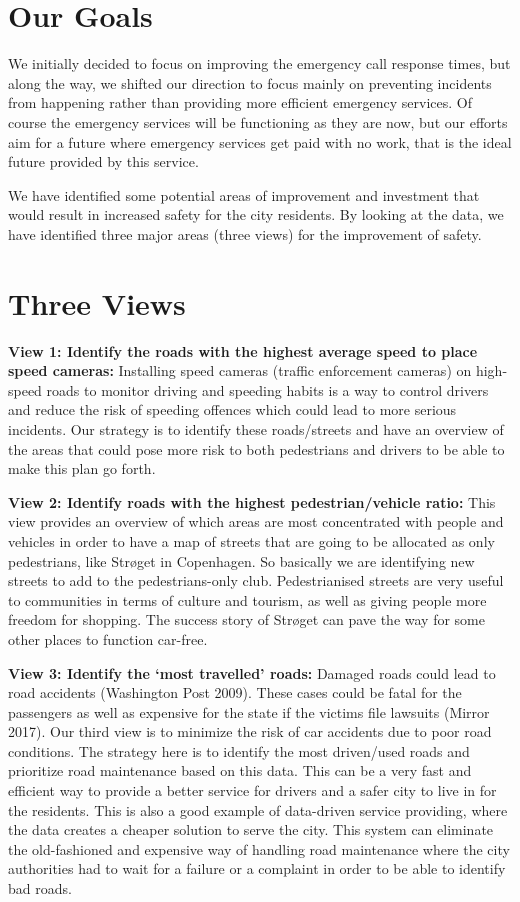 \documentclass[format=acmsmall, review=false, screen=true]{acmart}
\begin{document}
\section{Our Goals}
We initially decided to focus on improving the emergency call response times, but along the way, we shifted our direction to focus mainly on preventing incidents from happening rather than providing more efficient emergency services. Of course the emergency services will be functioning as they are now, but our efforts aim for a future where emergency services get paid with no work, that is the ideal future provided by this service.

We have identified some potential areas of improvement and investment that would result in increased safety for the city residents. By looking at the data, we have identified three major areas (three views) for the improvement of safety.

\section{Three Views}
\textbf{View 1: Identify the roads with the highest average speed to place speed cameras:}
Installing speed cameras (traffic enforcement cameras) on high-speed roads to monitor driving and speeding habits is a way to control drivers and reduce the risk of speeding offences which could lead to more serious incidents. Our strategy is to identify these roads/streets and have an overview of the areas that could pose more risk to both pedestrians and drivers to be able to make this plan go forth.

\textbf{View 2: Identify roads with the highest pedestrian/vehicle ratio:}
This view provides an overview of which areas are most concentrated with people and vehicles in order to have a map of streets that are going to be allocated as only pedestrians, like Strøget in Copenhagen. So basically we are identifying new streets to add to the pedestrians-only club. Pedestrianised streets are very useful to communities in terms of culture and tourism, as well as giving people more freedom for shopping. The success story of Strøget can pave the way for some other places to function car-free.

\textbf{View 3: Identify the ‘most travelled’ roads:}
Damaged roads could lead to road accidents (Washington Post 2009). These cases could be fatal for the passengers as well as expensive for the state if the victims file lawsuits (Mirror 2017). Our third view is to minimize the risk of car accidents due to poor road conditions. The strategy here is to identify the most driven/used roads and prioritize road maintenance based on this data. This can be a very fast and efficient way to provide a better service for drivers and a safer city to live in for the residents. This is also a good example of data-driven service providing, where the data creates a cheaper solution to serve the city. This system can eliminate the old-fashioned and expensive way of handling road maintenance where the city authorities had to wait for a failure or a complaint in order to be able to identify bad roads.
\end{document}

